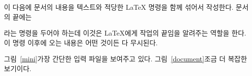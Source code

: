 \begin{code}
\verb||
\end{code}

이 다음에 문서의 내용을 텍스트와 적당한 \LaTeX{} 명령을 함께 섞어서 작성한다.
문서의 끝에는 
\begin{code}
\verb||
\end{code}
\noindent 라는 명령을 두어야 하는데 이것은 \LaTeX 에게 작업의 끝임을 알려주는 역할을 한다.
이 명령 이후에 오는 내용은 어떤 것이든 다 무시된다.

그림~\ref{mini}\이 가장 간단한 \LaTeXe{} 입력 파일을 보여주고 있다.
그림~\ref{document}\는 조금 더 복잡한 보기이다.

% 
% 

% 
% 

